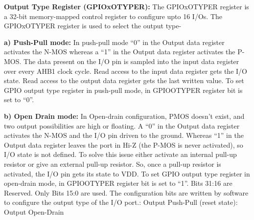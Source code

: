 \documentclass{article}
\begin{document}
\textbf{Output Type Register (GPIOx\textunderscore OTYPER):} The GPIOx\textunderscore OTYPER register is a 32-bit memory-mapped control register to configure upto 16 I/Os. The GPIOx\textunderscore OTYPER register is used to select the output type-\newline\newline

\textbf{a) Push-Pull mode: }In push-pull mode “0” in the Output data register activates the N-MOS whereas a “1” in the Output data register activates the P-MOS. The data present on the I/O pin is sampled into the input data register over every AHB1 clock cycle. Read access to the input data register gets the I/O state. Read access to the output data register gets the last written value. To set GPIO output type register in push-pull mode, in GPIO\textunderscore OTYPER register bit is set to “0”.\newline\newline

\textbf{b) Open Drain mode: }In Open-drain configuration, PMOS doesn’t exist, and two
output possibilities are high or floating. A “0” in the Output data register activates the N-MOS and the I/O pin driven to the ground. Whereas “1” in the Output data register leaves the port in Hi-Z (the P-MOS is never activated), so I/O state is not defined. To solve this issue either activate an internal pull-up resistor or give an external pull-up resistor. So, once a pull-up resistor is activated, the I/O pin gets its state to VDD. To set GPIO output type register in open-drain mode, in GPIO\textunderscore OTYPER register bit is set to “1”. \newline\newline
Bits 31:16 are Reserved. Only Bits 15:0 are used.\newline\newline
The configuration bits are written by software to configure the output type of the I/O port.\newline{}: Output Push-Pull (reset state)\newline{}: Output Open-Drain\newline\newline
\end{document}
